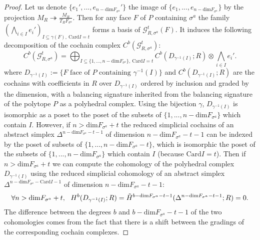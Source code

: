 \documentclass{article}
\begin{document}
\begin{proof}
    Let us denote $\{e_1',...,e_{n-\mathrm{dim}F_{\sigma^a}}'\}$ the image of $\{e_1,...,e_{n-\mathrm{dim}F_{\sigma^a}}\}$ by the projection $M_R \twoheadrightarrow \frac{M_R}{T_RF_{\sigma^a}}$. Then for any face $F$ of $P$ containing $\sigma^a$ the family $(\bigwedge_{i\in I}e_i')_{I \subseteq\gamma(F),~\mathrm{Card}I=t}$ forms a basis of $\mathcal{G}^t_{R,\sigma^a}(F)$. It induces the following decomposition of the cochain complex $C^{b}(\mathcal{G}^t_{R,\sigma^a})$:
    \begin{equation}
        C^{b}(\mathcal{G}^t_{R,\sigma^a}) = \bigoplus_{I\subseteq \{1,...,{n-\mathrm{dim}F_{\sigma^a}}\},~\mathrm{Card}I=t}C^{b}(D_{\gamma^{-1}(I)};R)\otimes \bigwedge_{i\in I}e_i'.
        \label{erty}
    \end{equation}
    where $D_{\gamma^{-1}(I)}:=\{F \text{ face of }P \text{ containing } \gamma^{-1}(I)\}$ and $C^{b}(D_{\gamma^{-1}(I)};R)$ are the cochains with coefficients in $R$ over $D_{\gamma^{-1}(I)}$ ordered by inclusion and graded by the dimension, with a balancing signature inherited from the balancing signature of the polytope $P$ as a polyhedral complex. Using the bijection $\gamma$, $D_{\gamma^{-1}(I)}$ is isomorphic as a poset to the poset of the subsets of $\{1,...,n-\mathrm{dim}F_{\sigma^a}\}$ which contain $I$. However, if $n>\mathrm{dim}F_{\sigma^a}+t$ the reduced simplicial cochains of an abstract simplex $\Delta^{n-\mathrm{dim}F_{\sigma^a}-t-1}$ of dimension $n-\mathrm{dim}F_{\sigma^a}-t-1$ can be indexed by the poset of subsets of $\{1,...,n-\mathrm{dim}F_{\sigma^a}-t\}$, which is isomorphic the poset of the subsets of $\{1,...,n-\mathrm{dim}F_{\sigma^a}\}$ which contain $I$ (because $\mathrm{Card}I=t$). Then if $n >\mathrm{dim}F_{\sigma^a}+t$ we can compute the cohomology of the polyhedral complex $D_{\gamma^{-1}(I)}$ using the reduced simplicial cohomology of an abstract simplex $\Delta^{n-\mathrm{dim}F_{\sigma^a}-\mathrm{Card}I-1}$ of dimension $n-\mathrm{dim}F_{\sigma^a}-t-1$:
    \begin{equation*}
        \forall n> \mathrm{dim}F_{\sigma^a}+t,~~H^{b}(D_{\gamma^{-1}(I)};R) =\Tilde H^{b-\mathrm{dim}F_{\sigma^a}-t-1}(\Delta^{n-\mathrm{dim}F_{\sigma^a}-t-1};R) =0.
    \end{equation*}
    The difference between the degrees $b$ and $b-\mathrm{dim}F_{\sigma^a}-t-1$ of the two cohomologies comes from the fact that there is a shift between the gradings of the corresponding cochain complexes.


\end{proof}
\end{document}
